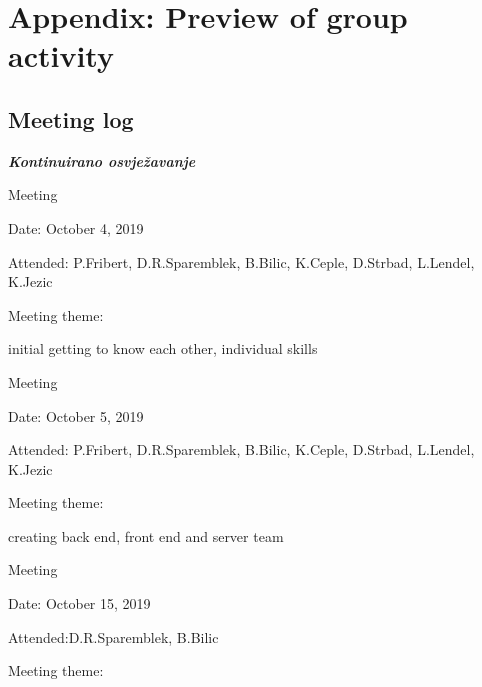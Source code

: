 \chapter*{Appendix: Preview of group activity}
		
		\section*{Meeting log}
		
		\textbf{\textit{Kontinuirano osvježavanje}}\\

		
		\begin{packed_enum}
			\item  Meeting
			

			\item[] \begin{packed_item}
				\item Date: October 4, 2019
				\item Attended: P.Fribert, D.R.Sparemblek, B.Bilic, K.Ceple, D.Strbad, L.Lendel, K.Jezic
				\item Meeting theme:
				\begin{packed_item}
					\item  initial getting to know each other, individual skills
				\end{packed_item}
			\end{packed_item}
			\item  Meeting
			\item[] \begin{packed_item}
				\item Date: October 5, 2019
				\item Attended: P.Fribert, D.R.Sparemblek, B.Bilic, K.Ceple, D.Strbad, L.Lendel, K.Jezic
				\item Meeting theme:
				\begin{packed_item}
					\item  creating back end, front end and server team
				\end{packed_item}
			\end{packed_item}
			\item  Meeting
			\item[] \begin{packed_item}
				\item Date: October 15, 2019
				\item Attended:D.R.Sparemblek, B.Bilic
				\item Meeting theme:

\end{packed_item}
\end{packed_enum}
